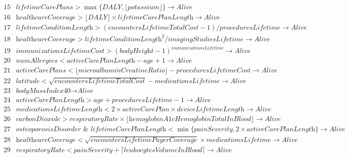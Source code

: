 \documentclass[ijds,nonblindrev]{informs-ijds}
\begin{document}
\begin{APPENDICES}
\begin{table}[!ht]
{\[\begin{array}{lr}
 15&  \textit{lifetimeCarePlans} > \max\{ \textit{DALY}, \lfloor \textit{potassium}\rfloor\} \rightarrow \textit{Alive}  \\ 
 16&  \textit{healthcareCoverage} > \lfloor \textit{DALY}\rfloor \times \textit{lifetimeCarePlanLength} \rightarrow \textit{Alive}  \\ 
 17&  \textit{lifetimeConditionLength} > (\textit{encountersLifetimeTotalCost} - 1)/\textit{proceduresLifetime} \rightarrow \textit{Alive}  \\ 
 18&  \textit{healthcareCoverage} > \textit{lifetimeConditionLength}^2/\textit{imagingStudiesLifetime}  \rightarrow \textit{Alive}  \\ 
 19& \textit{immunizationsLifetimeCost} > (\textit{bodyHeight}-1)^{\textit{immunizationsLifetime}} \rightarrow \textit{Alive}  \\ 
 20&  \textit{numAllergies} < \textit{activeCarePlanLength} - \textit{age} + 1  \rightarrow \textit{Alive}  \\ 
 21& \textit{activeCarePlans} < \lfloor \textit{microalbuminCreatineRatio} \rfloor - \textit{proceduresLifetimeCost} \rightarrow \textit{Alive}  \\ 
 22&  \textit{latitude} < \sqrt{\textit{encountersLifetimeTotalCost}} - \textit{medicationsLifetime} \rightarrow \textit{Alive}  \\ 
 23&  \textit{bodyMassIndex40} \rightarrow \textit{Alive}  \\ 
 24&  \textit{activeCarePlanLength} > \textit{age} + \textit{proceduresLifetime} -1 \rightarrow \textit{Alive}  \\ 
 25&  \textit{medicationsLifetimeLength} < 2\times \textit{activeCarePlan}\times \textit{deviceLifetimeLength}  \rightarrow \textit{Alive}  \\ 
 26&  \textit{carbonDioxide} > \textit{respiratoryRate}\times \lfloor \textit{hemoglobinA1cHemoglobinTotalInBlood}\rfloor \rightarrow \textit{Alive}  \\ 
 27&  \textit{osteoporosisDisorder } \& \textit{ lifetimeCarePlanLength} < \min\{\textit{painSeverity},2\times\textit{activeCarePlanLength}\}  \rightarrow \textit{Alive}  \\ 
 28&  \textit{healthcareCoverage} < \sqrt{ \textit{encountersLifetimePayerCoverage}} \times \textit{medicationsLifetime} \rightarrow \textit{Alive}  \\ 
 29&  \textit{respiratoryRate} < \textit{painSeverity} + \lceil \textit{leukocytesVolumeInBlood}\rceil  \rightarrow \textit{Alive}  \\ 

\end{array}\]}
\end{table}
\end{APPENDICES}
\end{document}

